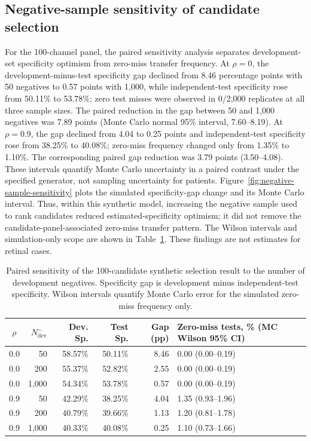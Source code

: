\documentclass{ieeeaccess}
\begin{document}
\subsection{Negative-sample sensitivity of candidate selection}
For the 100-channel panel, the paired sensitivity analysis separates development-set specificity optimism from zero-miss transfer frequency. At $\rho=0$, the development-minus-test specificity gap declined from 8.46 percentage points with 50 negatives to 0.57 points with 1,000, while independent-test specificity rose from 50.11\% to 53.78\%; zero test misses were observed in 0/2,000 replicates at all three sample sizes. The paired reduction in the gap between 50 and 1,000 negatives was 7.89 points (Monte Carlo normal 95\% interval, 7.60--8.19). At $\rho=0.9$, the gap declined from 4.04 to 0.25 points and independent-test specificity rose from 38.25\% to 40.08\%; zero-miss frequency changed only from 1.35\% to 1.10\%. The corresponding paired gap reduction was 3.79 points (3.50--4.08). These intervals quantify Monte Carlo uncertainty in a paired contrast under the specified generator, not sampling uncertainty for patients. Figure~\ref{fig:negative-sample-sensitivity} plots the simulated specificity-gap change and its Monte Carlo interval. Thus, within this synthetic model, increasing the negative sample used to rank candidates reduced estimated-specificity optimism; it did not remove the candidate-panel-associated zero-miss transfer pattern. The Wilson intervals and simulation-only scope are shown in Table~\ref{tab:negative-sample-sensitivity}. These findings are not estimates for retinal cases.

\begin{table}[t]
\centering
\caption{Paired sensitivity of the 100-candidate synthetic selection result to the number of development negatives. Specificity gap is development minus independent-test specificity. Wilson intervals quantify Monte Carlo error for the simulated zero-miss frequency only.}
\label{tab:negative-sample-sensitivity}
\footnotesize
\begin{tabularx}{\textwidth}{c r r r r X}
\toprule
$\rho$ & $N^-_{\mathrm{dev}}$ & Dev. Sp. & Test Sp. & Gap (pp) & Zero-miss tests, \% (MC Wilson 95\% CI) \\
\midrule
0.0 & 50 & 58.57\% & 50.11\% & 8.46 & 0.00 (0.00--0.19) \\
0.0 & 200 & 55.37\% & 52.82\% & 2.55 & 0.00 (0.00--0.19) \\
0.0 & 1,000 & 54.34\% & 53.78\% & 0.57 & 0.00 (0.00--0.19) \\
0.9 & 50 & 42.29\% & 38.25\% & 4.04 & 1.35 (0.93--1.96) \\
0.9 & 200 & 40.79\% & 39.66\% & 1.13 & 1.20 (0.81--1.78) \\
0.9 & 1,000 & 40.33\% & 40.08\% & 0.25 & 1.10 (0.73--1.66) \\
\bottomrule
\end{tabularx}
\end{table}
\end{document}
